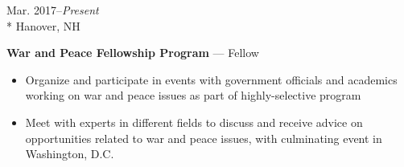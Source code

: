 \documentclass[a4paper,9pt]{article}
\begin{document}
\vspace{1ex}	
\begin{minipage}[t]{0.20\linewidth}
	\begin{small}
		\begin{spacing}{1.00}
			\begin{flushright}
				Mar. 2017--\textit{Present}
				\\*
				\vspace*{2.5pt}
				Hanover, NH
			\end{flushright}
		\end{spacing}
	\end{small}
\end{minipage}
\hspace{4mm}
\begin{minipage}[t]{0.75\linewidth}
	\begin{small}
		\begin{spacing}{1.00}
			\begin{flushleft}
				\textbf{War and Peace Fellowship Program} --- Fellow
                \begin{itemize}[itemsep=0pt,topsep=2.5pt,leftmargin=*]
					\item Organize and participate in events with government officials and academics working on war and peace issues as
part of highly-selective program
					\item Meet with experts in different fields to discuss and receive advice on opportunities related to war and peace issues,
with culminating event in Washington, D.C.
				\end{itemize}
			\end{flushleft}
		\end{spacing}
	\end{small}
\end{minipage}
\end{document}
